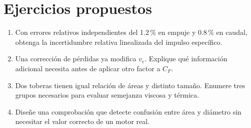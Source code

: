 \section{Ejercicios propuestos}
\begin{enumerate}
\item Con errores relativos independientes del 1.2\,\% en empuje y 0.8\,\% en caudal, obtenga la incertidumbre relativa linealizada del impulso específico.
\item Una corrección de pérdidas ya modifica $v_e$. Explique qué información adicional necesita antes de aplicar otro factor a $C_F$.
\item Dos toberas tienen igual relación de áreas y distinto tamaño. Enumere tres grupos necesarios para evaluar semejanza viscosa y térmica.
\item Diseñe una comprobación que detecte confusión entre área y diámetro sin necesitar el valor correcto de un motor real.
\end{enumerate}
